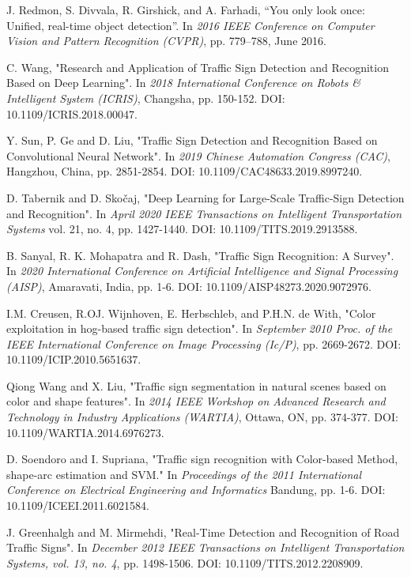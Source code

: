 \documentclass[10pt,twocolumn,letterpaper]{article}
\begin{document}
\begin{thebibliography}{9}
		J. Redmon, S. Divvala, R. Girshick, and A. Farhadi, “You only look
		once: Unified, real-time object detection”. In \textit{2016 IEEE Conference on Computer Vision and Pattern Recognition (CVPR)}, pp. 779–788, June
		2016.
	
		C. Wang, "Research and Application of Traffic Sign Detection and Recognition Based on Deep Learning". In \textit{2018 International Conference on Robots \& Intelligent System (ICRIS)}, Changsha, pp. 150-152. DOI: 10.1109/ICRIS.2018.00047.
	
		Y. Sun, P. Ge and D. Liu, "Traffic Sign Detection and Recognition Based on Convolutional Neural Network". In \textit{2019 Chinese Automation Congress (CAC)}, Hangzhou, China, pp. 2851-2854. DOI: 10.1109/CAC48633.2019.8997240.
		
		D. Tabernik and D. Skočaj, "Deep Learning for Large-Scale Traffic-Sign Detection and Recognition". In \textit{April 2020 IEEE Transactions on Intelligent Transportation Systems} vol. 21, no. 4, pp. 1427-1440. DOI: 10.1109/TITS.2019.2913588.
	
		B. Sanyal, R. K. Mohapatra and R. Dash, "Traffic Sign Recognition: A Survey". In \textit{2020 International Conference on Artificial Intelligence and Signal Processing (AISP)}, Amaravati, India, pp. 1-6. DOI: 10.1109/AISP48273.2020.9072976.
		
		 I.M. Creusen, R.OJ. Wijnhoven, E. Herbschleb, and P.H.N. de With, "Color exploitation in hog-based traffic sign detection". In  \textit{September 2010 Proc. of the IEEE International Conference on Image Processing (Ic/P)}, pp. 2669-2672. DOI: 10.1109/ICIP.2010.5651637.
		 
		Qiong Wang and X. Liu, "Traffic sign segmentation in natural scenes based on color and shape features". In \textit{2014 IEEE Workshop on Advanced Research and Technology in Industry Applications (WARTIA)}, Ottawa, ON, pp. 374-377. DOI: 10.1109/WARTIA.2014.6976273.
		
		D. Soendoro and I. Supriana, "Traffic sign recognition with Color-based Method, shape-arc estimation and SVM." In \textit{Proceedings of the 2011 International Conference on Electrical Engineering and Informatics} Bandung, pp. 1-6. DOI: 10.1109/ICEEI.2011.6021584.
		
		J. Greenhalgh and M. Mirmehdi, "Real-Time Detection and Recognition of Road Traffic Signs". In \textit{December 2012 IEEE Transactions on Intelligent Transportation Systems, vol. 13, no. 4}, pp. 1498-1506. DOI: 10.1109/TITS.2012.2208909.
		

\end{thebibliography}
\end{document}
